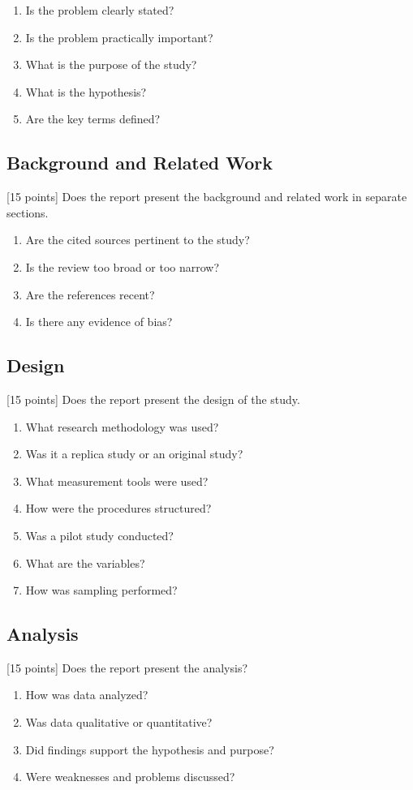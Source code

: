 \documentclass{winslabreport}
\begin{document}
\begin{enumerate}
\item Is the problem clearly stated?
\item Is the problem practically important?
\item What is the purpose of the study?
\item What is the hypothesis?
\item Are the key terms defined?
\end{enumerate}


\subsection{Background and Related Work}
[15 points] Does the report present the background and related work in separate sections.

\begin{enumerate}
\item Are the cited sources pertinent to the study?
\item Is the review too broad or too narrow?
\item Are the references recent?
\item Is there any evidence of bias?
\end{enumerate}

\subsection{Design}
[15 points] Does the report present the design of the study.
\begin{enumerate}
\item What research methodology was used?
\item Was it a replica study or an original study?
\item What measurement tools were used?
\item How were the procedures structured?
\item Was a pilot study conducted?
\item What are the variables?
\item How was sampling performed?
\end{enumerate}


\subsection{Analysis}
[15 points] Does the report present the analysis?
\begin{enumerate}
\item How was data analyzed?
\item Was data qualitative or quantitative?
\item Did findings support the hypothesis and purpose?
\item Were weaknesses and problems discussed?
\end{enumerate}
\end{document}
